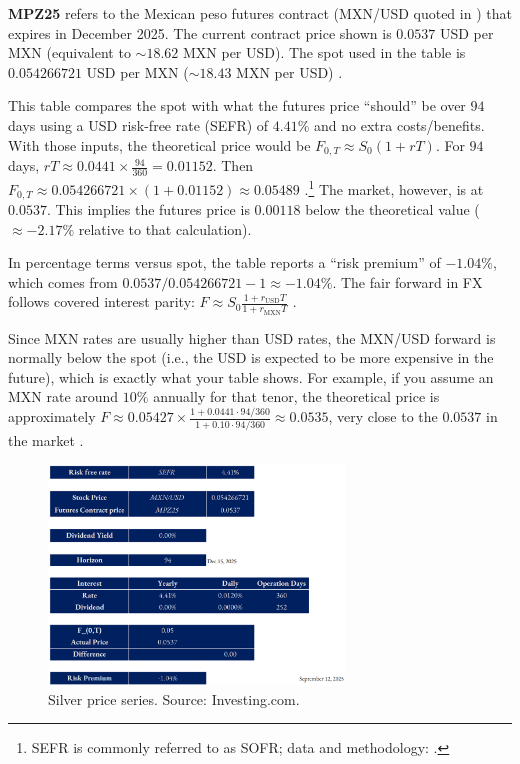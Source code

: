 \documentclass[10pt,a4paper]{article} %
\begin{document}
\textbf{MPZ25} refers to the Mexican peso futures contract (MXN/USD quoted in ) that expires in December 2025. The current contract price shown is \(0.0537\) USD per MXN (equivalent to \(\sim 18.62\) MXN per USD). The spot used in the table is \(0.054266721\) USD per MXN (\(\sim 18.43\) MXN per USD) \citep{cme_mxn_product,cme_mxn_rulebook}.

This table compares the spot with what the futures price “should” be over \(94\) days using a USD risk-free rate (SEFR) of \(4.41\%\) and no extra costs/benefits. With those inputs, the theoretical price would be \(F_{0,T} \approx S_0(1+rT)\). For \(94\) days, \(rT \approx 0.0441 \times \frac{94}{360} = 0.01152\). Then \(F_{0,T} \approx 0.054266721 \times (1+0.01152) \approx \mathbf{0.05489}\) \citep{frbny_sofr}.\footnote{SEFR is commonly referred to as SOFR; data and methodology: \citep{frbny_sofr,frbny_sofr_index}.}
The market, however, is at \(0.0537\). This implies the futures price is \(0.00118\) below the theoretical value (\(\approx -2.17\%\) relative to that calculation).

In percentage terms versus spot, the table reports a “risk premium” of \(-1.04\%\), which comes from \(0.0537/0.054266721 - 1 \approx -1.04\%\).
The fair forward in FX follows covered interest parity: \(F \approx S_0 \frac{1 + r_{\text{USD}} T}{1 + r_{\text{MXN}} T}\) \citep{bis_cip_2016,bis_cip_2024}.

Since MXN rates are usually higher than USD rates, the MXN/USD forward is normally below the spot (i.e., the USD is expected to be more expensive in the future), which is exactly what your table shows. For example, if you assume an MXN rate around \(10\%\) annually for that tenor, the theoretical price is approximately \(F \approx 0.05427 \times \frac{1 + 0.0441 \cdot 94/360}{1 + 0.10 \cdot 94/360} \approx 0.0535\), very close to the \(0.0537\) in the market \citep{bis_cip_2016}.

\begin{figure}[h]
\centering
\includegraphics[width=0.7\textwidth]{figures/usdmxn.png}
\caption{Silver price series. Source: Investing.com.}
\end{figure}
\end{document}
